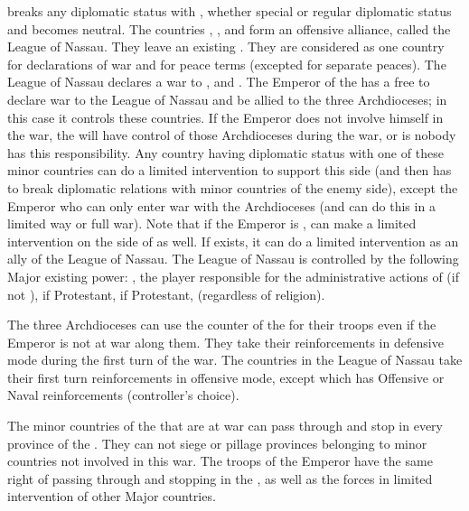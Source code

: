 \phevnt
\aparag \paysHollande breaks any diplomatic status with \SPA, whether special
\VASSAL or regular diplomatic status and becomes neutral.
\aparag The countries \paysOldenburg, \paysHanovre, \paysHanse and \paysBerg
form an offensive alliance, called the League of Nassau. They leave an
existing \GE.  They are considered as one country for declarations of war and
for peace terms (excepted for separate peaces).
\aparag The League of Nassau declares a war to \paysTreves, \paysCologne and
\paysMayence. The Emperor of the \HRE has a free \CB to declare war to the
League of Nassau and be allied to the three Archdioceses; in this case it
controls these countries. If the Emperor does not involve himself in the war,
the \SDCF will have control of those Archdioceses during the war, or \SPA is
nobody has this responsibility.
\aparag Any country having diplomatic status with one of these minor countries
can do a limited intervention to support this side (and then has to break
diplomatic relations with minor countries of the enemy side), except the
Emperor who can only enter war with the Archdioceses (and can do this in a
limited way or full war).
\bparag Note that if the Emperor is \AUSmin, \SPA can make a limited
intervention on the side of \AUSmin as well.
\aparag If \HOL exists, it can do a limited intervention as an ally of the
League of Nassau.
\aparag The League of Nassau is controlled by the following Major existing
power: \HOL, the player responsible for the administrative actions of
\payshollande (if not \SPA), \ENG if Protestant, \FRA if Protestant, \SUE
(regardless of religion).

\phadm
\aparag The three Archdioceses can use the counter of the \HRE for their
troops even if the Emperor is not at war along them. They take their
reinforcements in defensive mode during the first turn of the war.
\aparag The countries in the League of Nassau take their first turn
reinforcements in offensive mode, except \paysHanse which has Offensive or
Naval reinforcements (controller's choice).

\phmil
\aparag The minor countries of the \HRE that are at war can pass through and
stop in every province of the \HRE. They can not siege or pillage provinces
belonging to minor countries not involved in this war.
\aparag The troops of the Emperor have the same right of passing through and
stopping in the \HRE, as well as the forces in limited intervention of other
Major countries.

